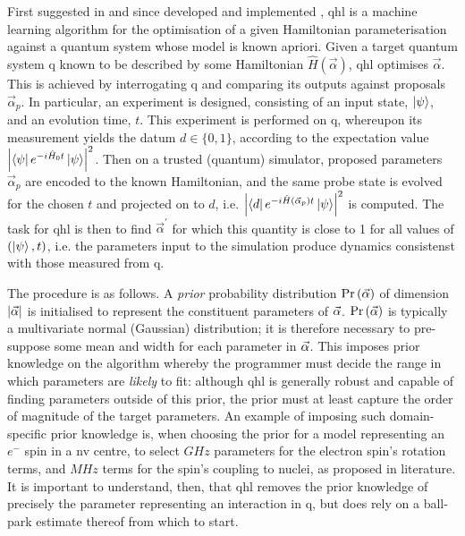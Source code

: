 First suggested in \cite{Granade:2012kj} and since developed \cite{wiebe2014qhlpra, Wiebe:2014qhl} 
    and implemented \cite{wang2017experimental,gentile2020learning}, 
\gls{qhl} is a machine learning algorithm for the optimisation of a given Hamiltonian parameterisation 
    against a quantum system whose model is known apriori. 
Given a target quantum system \gls{q} known to be described by some Hamiltonian $\hat{H}(\vec{\alpha})$, 
    \gls{qhl} optimises $\vec{\alpha}$.
This is achieved by interrogating \gls{q} and comparing its outputs against proposals $\vec{\alpha}_p$. 
In particular, an experiment is designed, consisting of an input state, $\ket{\psi}$, and an evolution time, $t$.
This experiment is performed on \gls{q}, whereupon its measurement yields the datum $d \in \{0, 1\}$, 
    according to the expectation value $\left| \bra{\psi} e^{-i \hat{H}_0 t} \ket{\psi} \right|^2$. 
Then on a trusted (quantum) simulator, proposed parameters $\vec{\alpha}_p$ are encoded to the 
    known Hamiltonian, and the same probe state is evolved for the chosen $t$ and projected on to $d$, 
    i.e. $\left| \bra{d} e^{-i \hat{H}(\vec{\alpha}_p) t } \ket{\psi} \right|^2 $ is computed.
The task for \gls{qhl} is then to find $\vec{\alpha}^{\prime}$ for which this quantity 
    is close to 1 for all values of $(\ket{\psi}, t)$, 
    i.e. the parameters input to the simulation produce dynamics consistenst with those measured from \gls{q}.
\par 

The procedure is as follows. 
A \emph{prior} probability distribution $\Pr\left(\vec{\alpha}\right)$ of dimension $\left| \vec{\alpha} \right|$ 
    is initialised to represent the constituent parameters of $\vec{\alpha}$. 
$\Pr\left(\vec{\alpha}\right)$ is typically a multivariate normal (Gaussian) distribution; 
    it is therefore necessary to pre-suppose some mean and width for each parameter in $\vec{\alpha}$. 
This imposes prior knowledge on the algorithm whereby the programmer must decide the range in 
    which parameters are \emph{likely} to fit:
    although \gls{qhl} is generally robust and capable of finding parameters outside of this prior,
    the prior must at least capture the order of magnitude of the target parameters. 
An example of imposing such domain-specific prior knowledge is, 
    when choosing the prior for a model representing an $e^-$ spin in a \gls{nv} centre,
    to select $GHz$ parameters for the electron spin's rotation terms, and $MHz$ terms 
    for the spin's coupling to nuclei, as proposed in literature. 
It is important to understand, then, that \gls{qhl} removes the prior knowledge 
    of precisely the parameter representing an interaction in \gls{q}, but does rely on a ball-park estimate thereof from which to start. 
\par 

